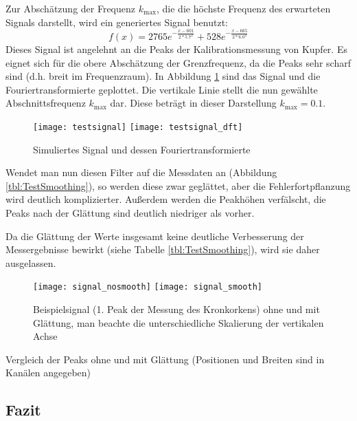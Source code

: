 \documentclass{../Misc/MontavonLaTeX/Montavon}
\newcommand{\halfwidth}{0.48\textwidth}
\begin{document}
Zur Abschätzung der Frequenz $k_\textrm{max}$, die die höchste Frequenz des erwarteten Signals darstellt, wird ein generiertes Signal benutzt:
\[
	f(x) = 2765 e^{-\frac{x - 601}{2 * 5.7^2}} + 528 e^{-\frac{x - 665}{2 * 6.0^2}}
\]
Dieses Signal ist angelehnt an die Peaks der Kalibrationsmessung von Kupfer. Es eignet sich für die obere Abschätzung der Grenzfrequenz, da die Peaks sehr scharf sind (d.h. breit im Frequenzraum).
In Abbildung \ref{fig:Fourier} sind das Signal und die Fouriertransformierte geplottet. Die vertikale Linie stellt die nun gewählte Abschnittsfrequenz $k_\textrm{max}$ dar. Diese beträgt in dieser Darstellung $k_\textrm{max} = 0.1$.

\begin{figure}[htbp]
\texttt{[image: testsignal]}
\texttt{[image: testsignal\_dft]}
\caption{Simuliertes Signal und dessen Fouriertransformierte}
\label{fig:Fourier}
\end{figure}

Wendet man nun diesen Filter auf die Messdaten an (Abbildung \ref{tbl:TestSmoothing}), so werden diese zwar geglättet, aber die Fehlerfortpflanzung wird deutlich komplizierter. Außerdem werden die Peakhöhen verfälscht, die Peaks nach der Glättung sind deutlich niedriger als vorher.

Da die Glättung der Werte insgesamt keine deutliche Verbesserung der Messergebnisse bewirkt (siehe Tabelle \ref{tbl:TestSmoothing}), wird sie daher ausgelassen.


\begin{figure}[htbp]
\texttt{[image: signal\_nosmooth]}
\texttt{[image: signal\_smooth]}
\caption{Beispielsignal (1. Peak der Messung des Kronkorkens) ohne und mit Glättung, man beachte die unterschiedliche Skalierung der vertikalen Achse}
\label{fig:TestSmoothing}
\end{figure}

\begin{table}[htbp]
\centering

\caption{Vergleich der Peaks ohne und mit Glättung (Positionen und Breiten sind in Kanälen angegeben)}
\label{tbl:TestSmoothing}
\end{table}

\subsection{Fazit}
\end{document}
